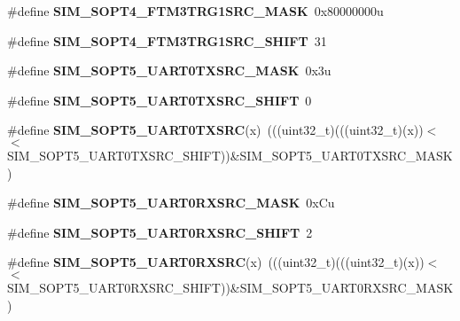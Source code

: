 \begin{DoxyCompactItemize}
\item 
\#define {\bfseries S\+I\+M\+\_\+\+S\+O\+P\+T4\+\_\+\+F\+T\+M3\+T\+R\+G1\+S\+R\+C\+\_\+\+M\+A\+SK}~0x80000000u\hypertarget{group__SIM__Register__Masks_gad6e00a798bfd9206fe31e2fa2b3a4171}{}\label{group__SIM__Register__Masks_gad6e00a798bfd9206fe31e2fa2b3a4171}

\item 
\#define {\bfseries S\+I\+M\+\_\+\+S\+O\+P\+T4\+\_\+\+F\+T\+M3\+T\+R\+G1\+S\+R\+C\+\_\+\+S\+H\+I\+FT}~31\hypertarget{group__SIM__Register__Masks_ga837c289419ec9b1924a8fd50f6afef5c}{}\label{group__SIM__Register__Masks_ga837c289419ec9b1924a8fd50f6afef5c}

\item 
\#define {\bfseries S\+I\+M\+\_\+\+S\+O\+P\+T5\+\_\+\+U\+A\+R\+T0\+T\+X\+S\+R\+C\+\_\+\+M\+A\+SK}~0x3u\hypertarget{group__SIM__Register__Masks_ga11646c1292cb7aab3128e1e563847e32}{}\label{group__SIM__Register__Masks_ga11646c1292cb7aab3128e1e563847e32}

\item 
\#define {\bfseries S\+I\+M\+\_\+\+S\+O\+P\+T5\+\_\+\+U\+A\+R\+T0\+T\+X\+S\+R\+C\+\_\+\+S\+H\+I\+FT}~0\hypertarget{group__SIM__Register__Masks_ga0220b88df4a0747579d24b77f4db4e67}{}\label{group__SIM__Register__Masks_ga0220b88df4a0747579d24b77f4db4e67}

\item 
\#define {\bfseries S\+I\+M\+\_\+\+S\+O\+P\+T5\+\_\+\+U\+A\+R\+T0\+T\+X\+S\+RC}(x)~(((uint32\+\_\+t)(((uint32\+\_\+t)(x))$<$$<$S\+I\+M\+\_\+\+S\+O\+P\+T5\+\_\+\+U\+A\+R\+T0\+T\+X\+S\+R\+C\+\_\+\+S\+H\+I\+FT))\&S\+I\+M\+\_\+\+S\+O\+P\+T5\+\_\+\+U\+A\+R\+T0\+T\+X\+S\+R\+C\+\_\+\+M\+A\+SK)\hypertarget{group__SIM__Register__Masks_ga65e932e39703b2b18dea82ca440fc68f}{}\label{group__SIM__Register__Masks_ga65e932e39703b2b18dea82ca440fc68f}

\item 
\#define {\bfseries S\+I\+M\+\_\+\+S\+O\+P\+T5\+\_\+\+U\+A\+R\+T0\+R\+X\+S\+R\+C\+\_\+\+M\+A\+SK}~0x\+Cu\hypertarget{group__SIM__Register__Masks_ga6160de3cd4b7169ac9095c0d0eee46f7}{}\label{group__SIM__Register__Masks_ga6160de3cd4b7169ac9095c0d0eee46f7}

\item 
\#define {\bfseries S\+I\+M\+\_\+\+S\+O\+P\+T5\+\_\+\+U\+A\+R\+T0\+R\+X\+S\+R\+C\+\_\+\+S\+H\+I\+FT}~2\hypertarget{group__SIM__Register__Masks_ga27e87f2f792b880bd156907ab20e9910}{}\label{group__SIM__Register__Masks_ga27e87f2f792b880bd156907ab20e9910}

\item 
\#define {\bfseries S\+I\+M\+\_\+\+S\+O\+P\+T5\+\_\+\+U\+A\+R\+T0\+R\+X\+S\+RC}(x)~(((uint32\+\_\+t)(((uint32\+\_\+t)(x))$<$$<$S\+I\+M\+\_\+\+S\+O\+P\+T5\+\_\+\+U\+A\+R\+T0\+R\+X\+S\+R\+C\+\_\+\+S\+H\+I\+FT))\&S\+I\+M\+\_\+\+S\+O\+P\+T5\+\_\+\+U\+A\+R\+T0\+R\+X\+S\+R\+C\+\_\+\+M\+A\+SK)\hypertarget{group__SIM__Register__Masks_ga90e650c4ec5da3b971b3acdf511c466a}{}\label{group__SIM__Register__Masks_ga90e650c4ec5da3b971b3acdf511c466a}


\end{DoxyCompactItemize}
